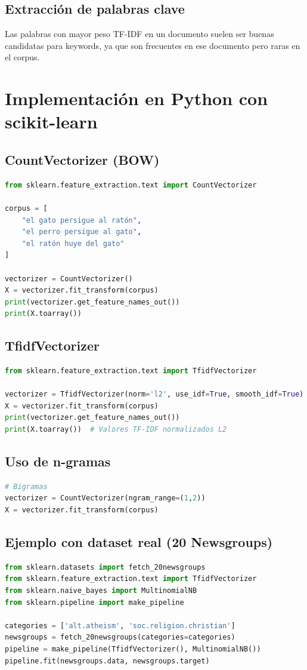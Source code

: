 \documentclass[12pt,a4paper,openany,oneside]{book}
\begin{document}
\subsection{Extracción de palabras clave}
Las palabras con mayor peso TF-IDF en un documento suelen ser buenas candidatas para keywords, ya que son frecuentes en ese documento pero raras en el corpus.

\section{Implementación en Python con scikit-learn}

\subsection{CountVectorizer (BOW)}
\begin{lstlisting}[language=Python]
from sklearn.feature_extraction.text import CountVectorizer

corpus = [
    "el gato persigue al ratón",
    "el perro persigue al gato",
    "el ratón huye del gato"
]

vectorizer = CountVectorizer()
X = vectorizer.fit_transform(corpus)
print(vectorizer.get_feature_names_out())
print(X.toarray())
\end{lstlisting}

\subsection{TfidfVectorizer}
\begin{lstlisting}[language=Python]
from sklearn.feature_extraction.text import TfidfVectorizer

vectorizer = TfidfVectorizer(norm='l2', use_idf=True, smooth_idf=True)
X = vectorizer.fit_transform(corpus)
print(vectorizer.get_feature_names_out())
print(X.toarray())  # Valores TF-IDF normalizados L2
\end{lstlisting}

\subsection{Uso de n-gramas}
\begin{lstlisting}[language=Python]
# Bigramas
vectorizer = CountVectorizer(ngram_range=(1,2))
X = vectorizer.fit_transform(corpus)
\end{lstlisting}

\subsection{Ejemplo con dataset real (20 Newsgroups)}
\begin{lstlisting}[language=Python]
from sklearn.datasets import fetch_20newsgroups
from sklearn.feature_extraction.text import TfidfVectorizer
from sklearn.naive_bayes import MultinomialNB
from sklearn.pipeline import make_pipeline

categories = ['alt.atheism', 'soc.religion.christian']
newsgroups = fetch_20newsgroups(categories=categories)
pipeline = make_pipeline(TfidfVectorizer(), MultinomialNB())
pipeline.fit(newsgroups.data, newsgroups.target)
\end{lstlisting}
\end{document}
